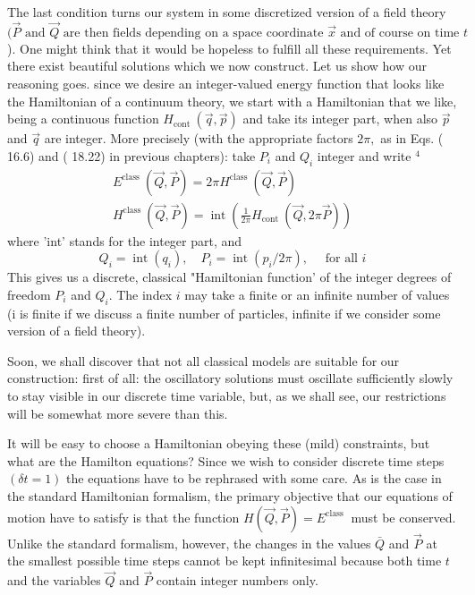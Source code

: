 \documentclass[main.tex]{subfiles}
\begin{document}
The last condition turns our system in some discretized version of a field theory $(\vec{P} \text { and } \vec{Q} \text { are then fields depending on a space coordinate } \vec{x} \text { and of course on time } t$ ). One might think that it would be hopeless to fulfill all these requirements. Yet there exist beautiful solutions which we now construct. Let us show how our reasoning goes. since we desire an integer-valued energy function that looks like the Hamiltonian of a continuum theory, we start with a Hamiltonian that we like, being a continuous function $H_{\text {cont }}(\vec{q}, \vec{p})$ and take its integer part, when also $\vec{p}$ and $\vec{q}$ are integer. More precisely (with the appropriate factors $2 \pi,$ as in Eqs. ( 16.6) and ( 18.22) in previous chapters): take $P_{i}$ and $Q_{i}$ integer and write $^{4}$
$$
\begin{array}{l}
{E^{\text {class }}(\vec{Q}, \vec{P})=2 \pi H^{\text {class }}(\vec{Q}, \vec{P})} \\
{H^{\text {class }}(\vec{Q}, \vec{P})=\operatorname{int}\left(\frac{1}{2 \pi} H_{\text {cont }}(\vec{Q}, 2 \pi \vec{P})\right)}
\end{array}
$$
where 'int' stands for the integer part, and
$$
Q_{i}=\operatorname{int}\left(q_{i}\right), \quad P_{i}=\operatorname{int}\left(p_{i} / 2 \pi\right), \quad \text { for all } i
$$
This gives us a discrete, classical "Hamiltonian function' of the integer degrees of freedom $P_{i}$ and $Q_{i} .$ The index $i$ may take a finite or an infinite number of values
(i is finite if we discuss a finite number of particles, infinite if we consider some version of a field theory).

Soon, we shall discover that not all classical models are suitable for our construction: first of all: the oscillatory solutions must oscillate sufficiently slowly to stay visible in our discrete time variable, but, as we shall see, our restrictions will be somewhat more severe than this.

It will be easy to choose a Hamiltonian obeying these (mild) constraints, but what are the Hamilton equations? Since we wish to consider discrete time steps $(\delta t=1)$ the equations have to be rephrased with some care. As is the case in the standard Hamiltonian formalism, the primary objective that our equations of motion have to satisfy is that the function $H(\vec{Q}, \vec{P})=E^{\text {class }}$ must be conserved. Unlike the standard formalism, however, the changes in the values $\bar{Q}$ and $\vec{P}$ at the smallest possible time steps cannot be kept infinitesimal because both time $t$ and the variables $\vec{Q}$ and $\vec{P}$ contain integer numbers only.
\end{document}
